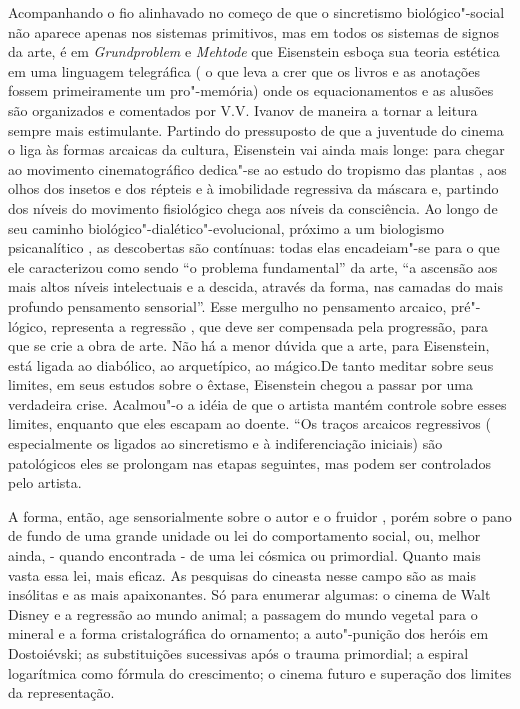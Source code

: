 Acompanhando o fio alinhavado no começo de que o sincretismo
biológico"-social não aparece apenas nos sistemas primitivos, mas em
todos os sistemas de signos da arte, é em \emph{Grundproblem} e
\emph{Mehtode} que Eisenstein esboça sua teoria estética em uma
linguagem telegráfica ( o que leva a crer que os livros e as anotações
fossem primeiramente um pro"-memória) onde os equacionamentos e as
alusões são organizados e comentados por V.V. Ivanov de maneira a tornar
a leitura sempre mais estimulante. Partindo do pressuposto de que a
juventude do cinema o liga às formas arcaicas da cultura, Eisenstein vai
ainda mais longe: para chegar ao movimento cinematográfico dedica"-se ao
estudo do tropismo das plantas , aos olhos dos insetos e dos répteis e à
imobilidade regressiva da máscara e, partindo dos níveis do movimento
fisiológico chega aos níveis da consciência. Ao longo de seu caminho
biológico"-dialético"-evolucional, próximo a um biologismo psicanalítico ,
as descobertas são contínuas: todas elas encadeiam"-se para o que ele
caracterizou como sendo ``o problema fundamental'' da arte, ``a ascensão
aos mais altos níveis intelectuais e a descida, através da forma, nas
camadas do mais profundo pensamento sensorial''. Esse mergulho no
pensamento arcaico, pré"-lógico, representa a regressão , que deve ser
compensada pela progressão, para que se crie a obra de arte. Não há a
menor dúvida que a arte, para Eisenstein, está ligada ao diabólico, ao
arquetípico, ao mágico.De tanto meditar sobre seus limites, em seus
estudos sobre o êxtase, Eisenstein chegou a passar por uma verdadeira
crise. Acalmou"-o a idéia de que o artista mantém controle sobre esses
limites, enquanto que eles escapam ao doente. ``Os traços arcaicos
regressivos ( especialmente os ligados ao sincretismo e à
indiferenciação iniciais) são patológicos eles se prolongam nas etapas
seguintes, mas podem ser controlados pelo artista.

A forma, então, age sensorialmente sobre o autor e o fruidor , porém
sobre o pano de fundo de uma grande unidade ou lei do comportamento
social, ou, melhor ainda, - quando encontrada - de uma lei cósmica ou
primordial. Quanto mais vasta essa lei, mais eficaz. As pesquisas do
cineasta nesse campo são as mais insólitas e as mais apaixonantes. Só
para enumerar algumas: o cinema de Walt Disney e a regressão ao mundo
animal; a passagem do mundo vegetal para o mineral e a forma
cristalográfica do ornamento; a auto"-punição dos heróis em Dostoiévski;
as substituições sucessivas após o trauma primordial; a espiral
logarítmica como fórmula do crescimento; o cinema futuro e superação dos
limites da representação.

